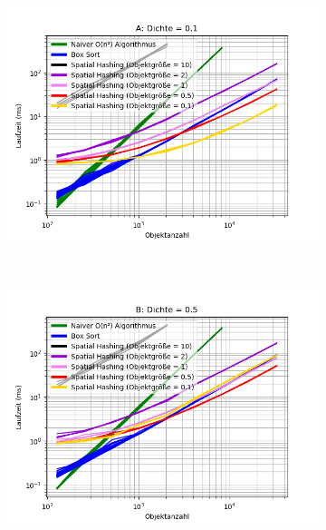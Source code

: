 \begin{figure}
	\begin{subfigure}[t]{0.55\textwidth}
		\centering
		\includegraphics[width=1\textwidth]{./res/symmetricComparison-A.png}
		
		\label{fig:symmetricComparison-A}
	\end{subfigure}
~
	\begin{subfigure}[t]{0.55\textwidth}
		\centering
		\includegraphics[width=1\textwidth]{./res/symmetricComparison-B.png}


\end{subfigure}
\end{figure}
